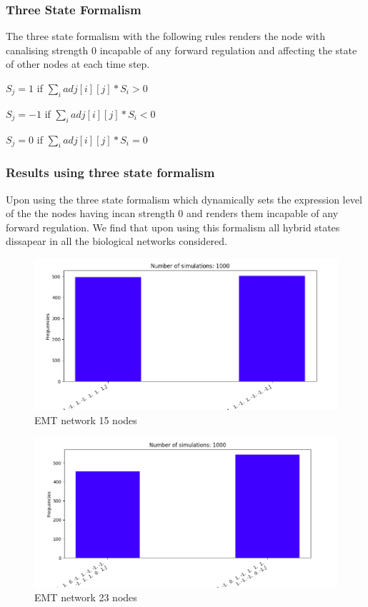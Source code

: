 \documentclass[t]{beamer}
\begin{document}
\begin{frame}
	\frametitle {Three State Formalism}
	The three state formalism with the following rules renders the node with canalising strength 0 incapable of any forward regulation and affecting the state of other nodes at each time step.
	\begin{item}
	\item $ S_j = 1 $ if    $  \sum_{ i } ^ { } adj[i][j] * S_i> 0 $

	\item $ S_j = -1 $ if    $  \sum_{ i } ^ { } adj[i][j] * S_i< 0 $

	\item $ S_j = 0 $ if    $  \sum_{ i } ^ { } adj[i][j] * S_i= 0 $


	\end{item}
	\end{frame}

\begin{frame}
	\frametitle{Results using three state formalism}
	Upon using the three state formalism which dynamically sets the expression level of the the nodes having incan strength 0 and renders them incapable of any forward regulation. We find that upon using this formalism all hybrid states dissapear in all the biological networks considered. 
\end{frame}

\begin{frame}
\begin{figure}[H]
	\includegraphics[scale=0.3]{img/emtracipetriple.png}
	\caption{EMT network 15 nodes}
\end{figure}
\end{frame}


\begin{frame}
\begin{figure}[H]

	\includegraphics[scale=0.3]{img/emtracipe2terenary.png}
	\caption{EMT network 23 nodes}
\end{figure}
\end{frame}
\end{document}
